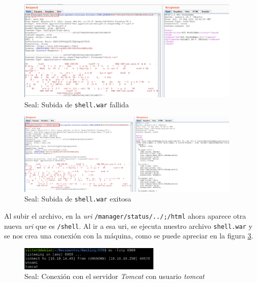 \begin{figure}[h]
    \centering
    \includegraphics[width=0.95\textwidth]{images/machines/seal/war-sin-editar.png}
    \caption{Seal: Subida de \texttt{shell.war} fallida}
    \label{fig:seal-war-no-editado}
\end{figure}

\begin{figure}[h]
    \centering
    \includegraphics[width=0.95\textwidth]{images/machines/seal/war-editado.png}
    \caption{Seal: Subida de \texttt{shell.war} exitosa}
    \label{fig:seal-war-editado}
\end{figure}

Al subir el archivo, en la \textit{uri} \texttt{/manager/status/../;/html} ahora aparece otra nueva \textit{uri} que es \texttt{/shell}. Al ir a esa \acrshort{uri}, se ejecuta nuestro archivo \texttt{shell.war} y se nos crea una conexión con la máquina, como se puede apreciar en la figura \ref{fig:seal-nc-tomcat}.

\begin{figure}[h]
    \centering
    \includegraphics[width=0.6\textwidth]{images/machines/seal/nc-tomcat.png}
    \caption{Seal: Conexión con el servidor \textit{Tomcat} con usuario \textit{tomcat}}
    \label{fig:seal-nc-tomcat}
\end{figure}

